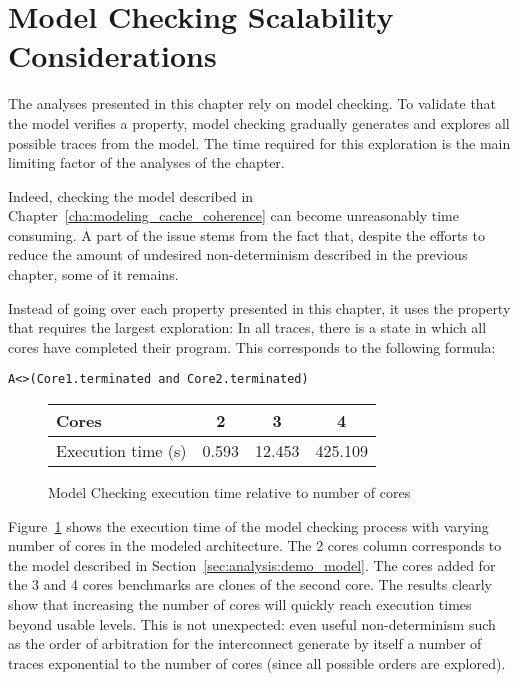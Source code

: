 \stopallthesefloats
\section{Model Checking Scalability Considerations}
The analyses presented in this chapter rely on model checking. To validate that
the model verifies a property, model checking gradually generates and explores
all possible traces from the model. The time required for this exploration is
the main limiting factor of the analyses of the chapter.

Indeed, checking the model described in
Chapter~\ref{cha:modeling_cache_coherence} can become unreasonably time
consuming. A part of the issue stems from the fact that, despite the efforts to
reduce the amount of undesired non-determinism described in the previous
chapter, some of it remains.

Instead of going over each property presented in this chapter, it uses the
property that requires the largest exploration: In all traces, there is a state
in which all cores have completed their program. This corresponds to the
following formula:
\begin{lstlisting}
A<>(Core1.terminated and Core2.terminated)
\end{lstlisting}

\begin{figure}
\begin{center}
\begin{tabular}{|l|c|c|c|}
\hline
Cores                & 2      & 3     & 4\\
\hline
Execution time (s)   & 0.593  & 12.453   & 425.109\\
\hline
\end{tabular}
\end{center}
\caption{Model Checking execution time relative to number of cores}
\label{fig:exec_time_cores}
\end{figure}

Figure~\ref{fig:exec_time_cores} shows the execution time of the model checking
process with varying number of cores in the modeled architecture. The 2 cores
column corresponds to the model described in
Section~\ref{sec:analysis:demo_model}. The cores added for the 3 and 4 cores
benchmarks are clones of the second core. The results clearly show that
increasing the number of cores will quickly reach execution times beyond usable
levels. This is not unexpected: even useful non-determinism such as the order
of arbitration for the interconnect generate by itself a number of traces
exponential to the number of cores (since all possible orders are explored).


